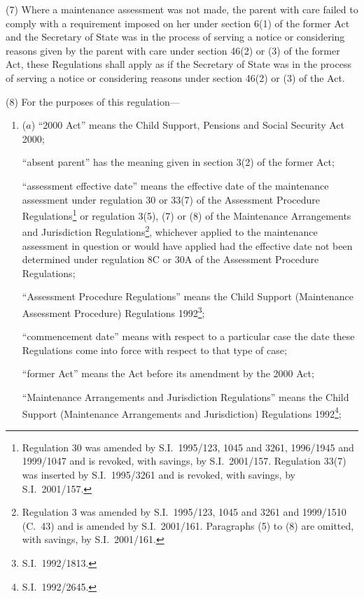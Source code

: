 \documentclass[12pt,a4paper]{article}
\begin{document}
(7) Where a maintenance assessment was not made, the parent with care failed to comply with a requirement imposed on her under section 6(1) of the former Act and the Secretary of State was in the process of serving a notice or considering reasons given by the parent with care under section 46(2) or (3) of the former Act, these Regulations shall apply as if the Secretary of State was in the process of serving a notice or considering reasons under section 46(2) or (3) of the Act.

(8) For the purposes of this regulation—
\begin{enumerate}\item[]($a$) “2000 Act” means the Child Support, Pensions and Social Security Act 2000;

“absent parent” has the meaning given in section 3(2) of the former Act;

“assessment effective date” means the effective date of the maintenance assessment under regulation 30 or 33(7) of the Assessment Procedure Regulations\footnote{Regulation 30 was amended by S.I.\ 1995/123, 1045 and 3261, 1996/1945 and 1999/1047 and is revoked, with savings, by S.I.\ 2001/157. Regulation 33(7) was inserted by S.I.\ 1995/3261 and is revoked, with savings, by S.I.\ 2001/157.} or regulation 3(5), (7) or (8) of the Maintenance Arrangements and Jurisdiction Regulations\footnote{Regulation 3 was amended by S.I.\ 1995/123, 1045 and 3261 and 1999/1510 (C.\ 43) and is amended by S.I.\ 2001/161. Paragraphs (5) to (8) are omitted, with savings, by S.I.\ 2001/161.}, whichever applied to the maintenance assessment in question or would have applied had the effective date not been determined under regulation 8C or 30A of the Assessment Procedure Regulations;

“Assessment Procedure Regulations” means the Child Support (Maintenance Assessment Procedure) Regulations 1992\footnote{S.I.\ 1992/1813.};

“commencement date” means with respect to a particular case the date these Regulations come into force with respect to that type of case;

“former Act” means the Act before its amendment by the 2000 Act;

“Maintenance Arrangements and Jurisdiction Regulations” means the Child Support (Maintenance Arrangements and Jurisdiction) Regulations 1992\footnote{S.I.\ 1992/2645.};


\end{enumerate}
\end{document}
